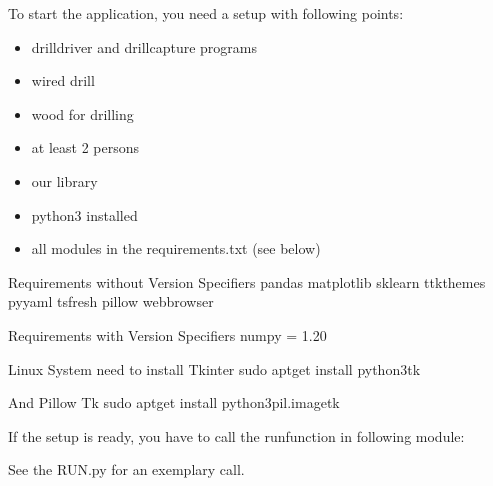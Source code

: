 \documentclass[letterpaper,10pt,english]{sphinxmanual}
\begin{document}
\sphinxAtStartPar
To start the application, you need a setup with following points:
\begin{itemize}
\item {} 
\sphinxAtStartPar
drilldriver and drillcapture programs

\item {} 
\sphinxAtStartPar
wired drill

\item {} 
\sphinxAtStartPar
wood for drilling

\item {} 
\sphinxAtStartPar
at least 2 persons

\item {} 
\sphinxAtStartPar
our library

\item {} 
\sphinxAtStartPar
python3 installed

\item {} 
\sphinxAtStartPar
all modules in the requirements.txt (see below)

\end{itemize}

\begin{sphinxVerbatim}[commandchars=\\\{\}]
\PYGZsh{}\PYGZsh{}\PYGZsh{}\PYGZsh{}\PYGZsh{}\PYGZsh{} Requirements without Version Specifiers \PYGZsh{}\PYGZsh{}\PYGZsh{}\PYGZsh{}\PYGZsh{}\PYGZsh{}
pandas
matplotlib
sklearn
ttkthemes
pyyaml
tsfresh
pillow
webbrowser

\PYGZsh{}\PYGZsh{}\PYGZsh{}\PYGZsh{}\PYGZsh{}\PYGZsh{} Requirements with Version Specifiers \PYGZsh{}\PYGZsh{}\PYGZsh{}\PYGZsh{}\PYGZsh{}\PYGZsh{}
numpy \PYGZlt{}= 1.20

\PYGZsh{}\PYGZsh{}\PYGZsh{}\PYGZsh{}\PYGZsh{}\PYGZsh{} Linux System need to install \PYGZsh{}\PYGZsh{}\PYGZsh{}\PYGZsh{}\PYGZsh{}\PYGZsh{}
\PYGZsh{} Tkinter
\PYGZsh{} sudo apt\PYGZhy{}get install python3\PYGZhy{}tk

\PYGZsh{} And Pillow Tk
\PYGZsh{} sudo apt\PYGZhy{}get install python3\PYGZhy{}pil.imagetk
\end{sphinxVerbatim}

\sphinxAtStartPar
If the setup is ready, you have to call the run\sphinxhyphen{}function in following module:

\sphinxAtStartPar
{\hyperref[\detokenize{anoog.automation:gui}]{}}

\sphinxAtStartPar
See the RUN.py for an exemplary call.
\end{document}
